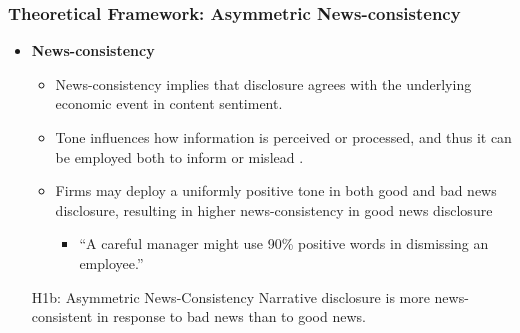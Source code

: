 \documentclass{beamer}
\begin{document}
\begin{frame}
\frametitle{Theoretical Framework: Asymmetric News-consistency}
\begin{itemize}
\item \textbf{News-consistency}

\begin{itemize}
\item News-consistency implies that disclosure agrees with the underlying economic event in content sentiment. %
\item Tone influences how information is perceived or processed, and thus it can be employed both to inform or mislead \citep{davisNumbersMeasuringInformation2012, liInformationContentForwardLooking2010, huangToneManagement2014}.
\item Firms may deploy a uniformly positive tone in both good and bad news disclosure, resulting in higher news-consistency in good news disclosure 
\begin{itemize}
\item ``A careful manager might use 90\% positive words in dismissing an employee.'' \citep[p.1206]{loughranTextualAnalysisAccounting2016}
\end{itemize}
\end{itemize}

\medskip
\pause
\begin{block}{H1b: Asymmetric News-Consistency}
Narrative disclosure is more news-consistent in response to bad news than to good news.
\end{block}


\end{itemize}
\end{frame}
\end{document}
